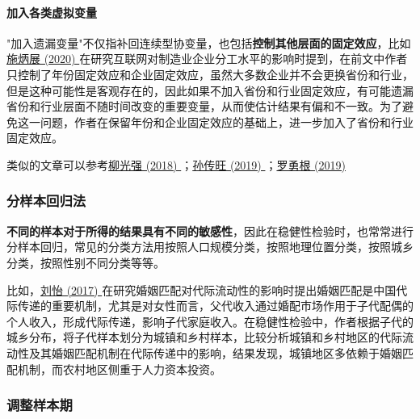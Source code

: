 \documentclass[11pt,a4paper]{ctexart}
\begin{document}
\paragraph{加入各类虚拟变量}

"加入遗漏变量"不仅指补回连续型协变量，也包括\textbf{控制其他层面的固定效应}，比如\href{https://kns.cnki.net/KCMS/detail/detail.aspx?dbcode=CJFQ&dbname=CJFDLAST2020&filename=GLSJ202004014&v=MzAwNTF0Rnl6bFU3ck1JaUhZWkxHNEhOSE1xNDlFWtextbfSOGVYMUx1eFlTN0RoMVQzcVRyV00xRnJDVVI3cWZZT1I=}{施炳展
(2020)
}在研究互联网对制造业企业分工水平的影响时提到，在前文中作者只控制了年份固定效应和企业固定效应，虽然大多数企业并不会更换省份和行业，但是这种可能性是客观存在的，因此如果不加入省份和行业固定效应，有可能遗漏省份和行业层面不随时间改变的重要变量，从而使估计结果有偏和不一致。为了避免这一问题，作者在保留年份和企业固定效应的基础上，进一步加入了省份和行业固定效应。

类似的文章可以参考\href{https://xueshu.baidu.com/usercenter/paper/show?paperid=11530j109g5q0e00724m0ek0dg590730&site=xueshu_se&hitarticle=1}{柳光强
(2018)
}；\href{https://xueshu.baidu.com/usercenter/paper/show?paperid=1e2c0820qa0900c0cg270m007d398523&site=xueshu_se}{孙传旺
(2019)
}；\href{https://xueshu.baidu.com/usercenter/paper/show?paperid=1a4p0r10kg000pd0cr0700j049361526&site=xueshu_se}{罗勇根
(2019)}

\subsubsection{分样本回归法}

\textbf{不同的样本对于所得的结果具有不同的敏感性}，因此在稳健性检验时，也常常进行分样本回归，常见的分类方法用按照人口规模分类，按照地理位置分类，按照城乡分类，按照性别不同分类等等。

比如，\href{https://xueshu.baidu.com/usercenter/paper/show?paperid=06871935e1791622e676c9d631b805e9&site=xueshu_se&hitarticle=1}{刘怡
(2017)
}在研究婚姻匹配对代际流动性的影响时提出婚姻匹配是中国代际传递的重要机制，尤其是对女性而言，父代收入通过婚配市场作用于子代配偶的个人收入，形成代际传递，影响子代家庭收入。在稳健性检验中，作者根据子代的城乡分布，将子代样本划分为城镇和乡村样本，比较分析城镇和乡村地区的代际流动性及其婚姻匹配机制在代际传递中的影响，结果发现，城镇地区多依赖于婚姻匹配机制，而农村地区侧重于人力资本投资。

\subsubsection{调整样本期}
\end{document}

